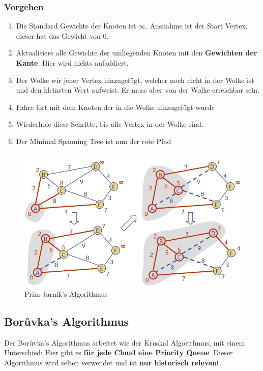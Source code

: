 \subsubsection{Vorgehen}
\begin{enumerate}
	\item Die Standard Gewichte der Knoten ist $\infty$. Ausnahme ist der Start Vertex, dieser hat das Gewicht von 0.
	\item Aktualisiere alle Gewichte der umliegenden Knoten mit den \textbf{Gewichten der Kante}. Hier wird nichts aufaddiert.
	\item Der Wolke wir jener Vertex hinzugefügt, welcher noch nicht in der Wolke ist und den kleinsten Wert aufweist. Er muss aber von der Wolke erreichbar sein.
	\item Fahre fort mit dem Knoten der in die Wolke hinzugefügt wurde
	\item Wiederhole diese Schritte, bis alle Vertex in der Wolke sind. 
	\item Der Minimal Spanning Tree ist nun der rote Pfad
\end{enumerate}

\begin{figure}[h!]
	\centering
	\includegraphics[width=0.9\linewidth]{images/prim-jarnik-algo}
	\caption{Prim-Jarnik's Algorithmus}
	\label{fig:prim-jarnik-algo}
\end{figure}

\clearpage

\subsection{Borůvka's Algorithmus}
Der Borůvka's Algorithmus arbeitet wie der Kruskal Algorithmus, mit einem Unterschied: Hier gibt es \textbf{für jede Cloud eine Priority Queue}. Dieser Algorithmus wird selten verwendet und ist \textbf{nur historisch relevant}.

